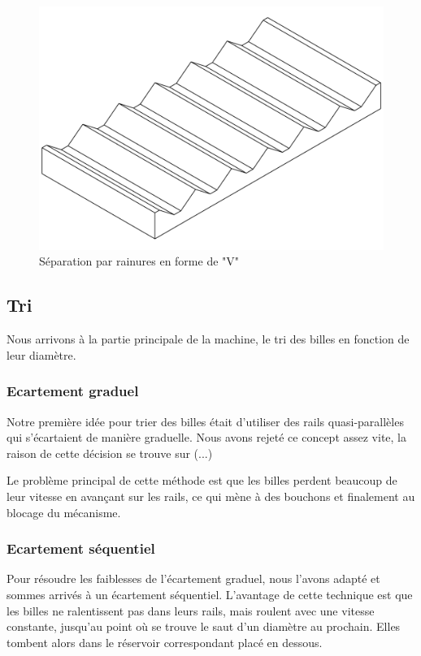 \begin{figure}
    \centering
    \includegraphics[width=\textwidth]{Graphics/Rails/SEPARATEUR_V.pdf}
    \caption{Séparation par rainures en forme de "V"}
\end{figure}

\subsection{Tri}
Nous arrivons à la partie principale de la machine, le tri des billes en fonction de leur diamètre.

\subsubsection{Ecartement graduel}
Notre première idée pour trier des billes était d'utiliser des rails quasi-parallèles qui s'écartaient de manière graduelle. Nous avons rejeté ce concept assez vite, la raison de cette décision se trouve sur (...) %

Le problème principal de cette méthode est que les billes perdent beaucoup de leur vitesse en avançant sur les rails, ce qui mène à des bouchons et finalement au blocage du mécanisme.

\subsubsection{Ecartement séquentiel}
Pour résoudre les faiblesses de l'écartement graduel, nous l'avons adapté et sommes arrivés à un écartement séquentiel. L'avantage de cette technique est que les billes ne ralentissent pas dans leurs rails, mais roulent avec une vitesse constante, jusqu'au point où se trouve le saut d'un diamètre au prochain. Elles tombent alors dans le réservoir correspondant placé en dessous.

